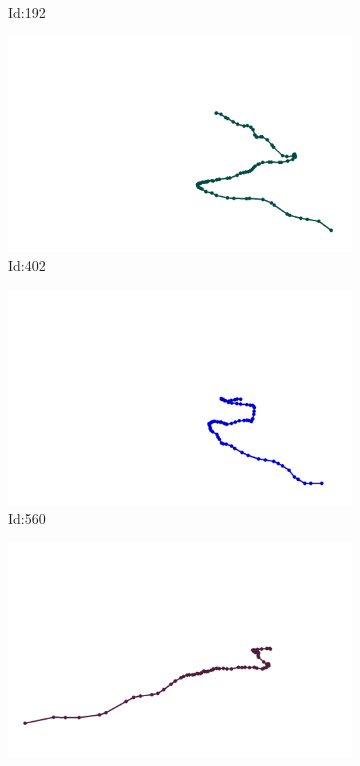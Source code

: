 \documentclass[12pt,twoside]{report}
\begin{document}
\begin{figure}
\begin{subfigure}[b]{0.20\textwidth}
\caption{Id:192}
\end{subfigure}
\begin{subfigure}[b]{0.20\textwidth}
\centering
\includegraphics[width=\textwidth]{../../trajectories/402.png}
\caption{Id:402}
\end{subfigure}
\begin{subfigure}[b]{0.20\textwidth}
\centering
\includegraphics[width=\textwidth]{../../trajectories/560.png}
\caption{Id:560}
\end{subfigure}
\begin{subfigure}[b]{0.20\textwidth}
\centering
\includegraphics[width=\textwidth]{../../trajectories/655.png}

\end{subfigure}
\end{figure}
\end{document}
